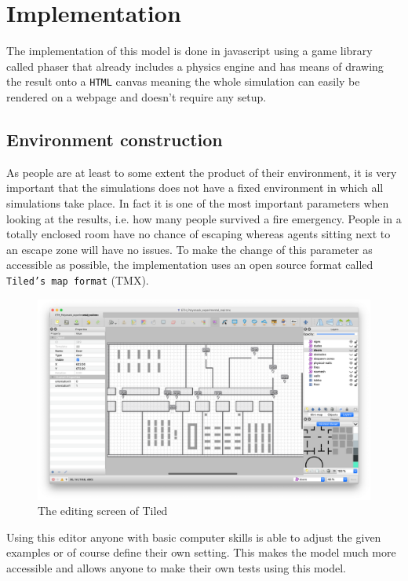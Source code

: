 \documentclass[11pt]{article}
\begin{document}
\section{Implementation}

The implementation of this model is done in javascript using a game library called phaser that already includes a physics engine and has means of drawing the result onto a \texttt{HTML} canvas meaning the whole simulation can easily be rendered on a webpage and doesn't require any setup.

\subsection{Environment construction}
As people are at least to some extent the product of their environment, it is very important that the simulations does not have a fixed environment in which all simulations take place. In fact it is one of the most important parameters when looking at the results, i.e. how many people survived a fire emergency. People in a totally enclosed room have no chance of escaping whereas agents sitting next to an escape zone will have no issues. To make the change of this parameter as accessible as possible, the implementation uses an open source format called \texttt{Tiled's map format} (TMX).

\begin{figure}[H]
	\centering
	\includegraphics[width=1\linewidth]{assets/tiled-editor}\\
	The editing screen of Tiled
\end{figure}

Using this editor anyone with basic computer skills is able to adjust the given examples or of course define their own setting. This makes the model much more accessible and allows anyone to make their own tests using this model.
\end{document}
